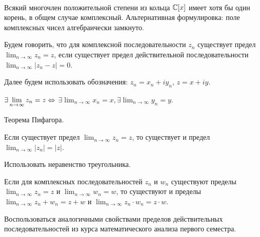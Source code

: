 \begin{theorem}~
    \label{ota}

    Всякий многочлен положительной степени из кольца $\mathbb{C}[x]$ имеет хотя бы один корень, в общем случае комплексный.
    Альтернативная формулировка: поле комплексных чисел алгебраически замкнуто.
\end{theorem}

\begin{definition}
    Будем говорить, что для комплексной последовательности $z_n$ существует предел 
    $\displaystyle\lim_{n\to \infty} {z_n} = z$, 
    если существует предел действительной последовательности $\displaystyle\lim_{n\to \infty} {|z_n - z|} = 0$.
\end{definition}

\begin{agreement}
    Далее будем использовать обозначения: $z_n = x_n + i y_n$, $z = x + i y$.
\end{agreement}

\begin{lemma}
    \label{lemma1}
    $\exists \displaystyle\lim_{n\to \infty} {z_n} = z \Leftrightarrow$ $\exists \displaystyle\lim_{n\to \infty} {x_n} = x, \exists \displaystyle\lim_{n\to \infty} {y_n} = y$.
\end{lemma}

\begin{idea}
    Теорема Пифагора.
\end{idea}

\begin{lemma}
    \label{lemma2}
    Если существует предел $\displaystyle\lim_{n\to \infty} {z_n} = z$, то существует и предел $\displaystyle\lim_{n\to \infty} {|z_n|} = |z|$.
\end{lemma}

\begin{idea}
    Использовать неравенство треугольника.
\end{idea}

\begin{lemma}
    \label{lemma3}
    Если для комплексных последовательностей $z_n$ и $w_n$ существуют пределы \\
    $\displaystyle\lim_{n\to \infty} {z_n} = z$ и $\displaystyle\lim_{n\to \infty} {w_n} = w$, 
    то существуют и пределы $\displaystyle\lim_{n\to \infty} {z_n + w_n} = z + w$ и 
    $\displaystyle\lim_{n\to \infty} {z_n \cdot w_n} = z \cdot w$.
\end{lemma}

\begin{idea}
    Воспользоваться аналогичными свойствами пределов действительных последовательностей из курса 
    математического анализа первого семестра.
\end{idea}

